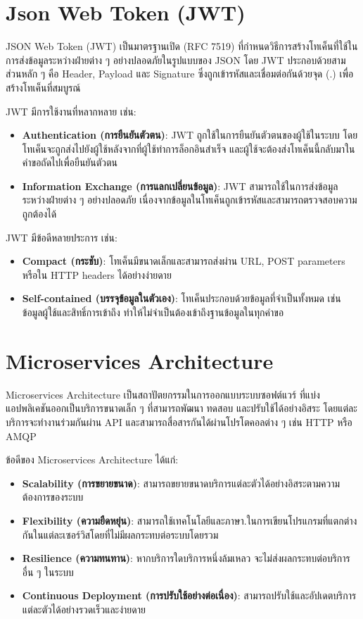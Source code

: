 \section{Json Web Token (JWT)}
JSON Web Token (JWT) \cite{jwt} เป็นมาตรฐานเปิด (RFC 7519) ที่กำหนดวิธีการสร้างโทเค็นที่ใช้ในการส่งข้อมูลระหว่างฝ่ายต่าง ๆ อย่างปลอดภัยในรูปแบบของ JSON โดย JWT ประกอบด้วยสามส่วนหลัก ๆ คือ Header, Payload และ Signature ซึ่งถูกเข้ารหัสและเชื่อมต่อกันด้วยจุด (.) เพื่อสร้างโทเค็นที่สมบูรณ์

JWT มีการใช้งานที่หลากหลาย เช่น:
\begin{itemize}
  \item \textbf{Authentication (การยืนยันตัวตน)}: JWT ถูกใช้ในการยืนยันตัวตนของผู้ใช้ในระบบ โดยโทเค็นจะถูกส่งไปยังผู้ใช้หลังจากที่ผู้ใช้ทำการล็อกอินสำเร็จ และผู้ใช้จะต้องส่งโทเค็นนี้กลับมาในคำขอถัดไปเพื่อยืนยันตัวตน
  \item \textbf{Information Exchange (การแลกเปลี่ยนข้อมูล)}: JWT สามารถใช้ในการส่งข้อมูลระหว่างฝ่ายต่าง ๆ อย่างปลอดภัย เนื่องจากข้อมูลในโทเค็นถูกเข้ารหัสและสามารถตรวจสอบความถูกต้องได้
\end{itemize}

JWT มีข้อดีหลายประการ เช่น:
\begin{itemize}
  \item \textbf{Compact (กระชับ)}: โทเค็นมีขนาดเล็กและสามารถส่งผ่าน URL, POST parameters หรือใน HTTP headers ได้อย่างง่ายดาย
  \item \textbf{Self-contained (บรรจุข้อมูลในตัวเอง)}: โทเค็นประกอบด้วยข้อมูลที่จำเป็นทั้งหมด เช่น ข้อมูลผู้ใช้และสิทธิ์การเข้าถึง ทำให้ไม่จำเป็นต้องเข้าถึงฐานข้อมูลในทุกคำขอ
\end{itemize}

\section{Microservices Architecture}
Microservices Architecture \cite{microservices} เป็นสถาปัตยกรรมในการออกแบบระบบซอฟต์แวร์ ที่แบ่งแอปพลิเคชันออกเป็นบริการขนาดเล็ก ๆ ที่สามารถพัฒนา ทดสอบ และปรับใช้ได้อย่างอิสระ โดยแต่ละบริการจะทำงานร่วมกันผ่าน API และสามารถสื่อสารกันได้ผ่านโปรโตคอลต่าง ๆ เช่น HTTP หรือ AMQP

ข้อดีของ Microservices Architecture ได้แก่:
\begin{itemize}
  \item \textbf{Scalability (การขยายขนาด)}: สามารถขยายขนาดบริการแต่ละตัวได้อย่างอิสระตามความต้องการของระบบ
  \item \textbf{Flexibility (ความยืดหยุ่น)}: สามารถใช้เทคโนโลยีและภาษา.ในการเขียนโปรแกรมที่แตกต่างกันในแต่ละเซอร์วิสโดยที่ไม่มีผลกระทบต่อระบบโดยรวม
  \item \textbf{Resilience (ความทนทาน)}: หากบริการใดบริการหนึ่งล้มเหลว จะไม่ส่งผลกระทบต่อบริการอื่น ๆ ในระบบ
  \item \textbf{Continuous Deployment (การปรับใช้อย่างต่อเนื่อง)}: สามารถปรับใช้และอัปเดตบริการแต่ละตัวได้อย่างรวดเร็วและง่ายดาย
\end{itemize}

